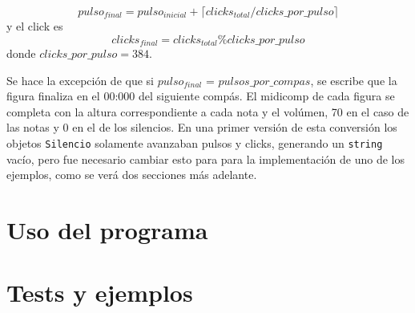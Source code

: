 \documentclass{article}
\begin{document}
$$
pulso_{final} = pulso_{inicial} + \lceil clicks_{total} / clicks\_por\_pulso \rceil
$$
\noindent
y el click es 
$$
clicks_{final} = clicks_{total} \% clicks\_por\_pulso
$$ 
\noindent
donde $clicks\_por\_pulso = 384$.

Se hace la excepción de que si $pulso_{final}$ = $pulsos\_por\_compas$, se escribe que la figura
finaliza en el 00:000 del siguiente compás.  El midicomp de cada figura se completa con la altura
correspondiente a cada nota y el volúmen, 70 en el caso de las notas y 0 en el de los silencios.  En
una primer versión de esta conversión los objetos \texttt{Silencio} solamente avanzaban pulsos y
clicks, generando un \texttt{string} vacío, pero fue necesario cambiar esto para para la
implementación de uno de los ejemplos, como se verá dos secciones más adelante.

\section*{Uso del programa}


\section*{Tests y ejemplos}
\end{document}
